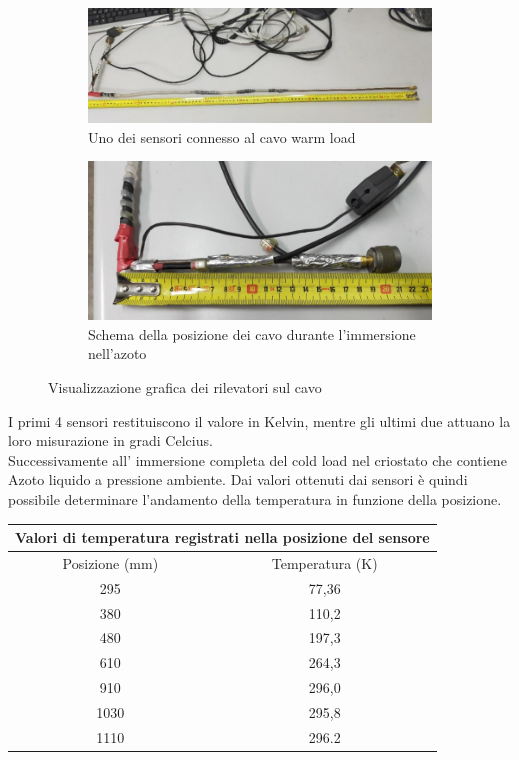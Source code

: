 \begin{figure}[h]
	\begin{subfigure}{0.49\textwidth}
		\includegraphics[width=\textwidth]{Posizione_sensori_2.png}
    		\caption{Uno dei sensori connesso al cavo warm load}
    		\label{fig:sub3}
	\end{subfigure}
	\hfill
	\begin{subfigure}{0.49\textwidth}
    		\includegraphics[width=\textwidth]{Posizione_sensori_4.png}
    		\caption{Schema della posizione dei cavo durante l'immersione nell'azoto}
    		\label{fig:sub4}
	\end{subfigure}

\caption{Visualizzazione grafica dei rilevatori sul cavo}
\label{fig:cavi}
\end{figure}


I primi 4 sensori restituiscono il valore in Kelvin, mentre gli ultimi due attuano la loro misurazione in gradi Celcius.\\
Successivamente all' immersione completa del cold load nel criostato che contiene Azoto liquido a pressione ambiente. Dai valori ottenuti dai sensori è quindi possibile determinare l'andamento della temperatura in funzione della posizione. 

\begin{table}
\centering

\begin{tabular}{ |c|c|  }
	\hline
	\multicolumn{2}{|c|}{Valori di temperatura registrati nella posizione del sensore} \\
	\hline
	Posizione (mm)& Temperatura (K) \\
	\hline
	295   & 77,36    \\
	380  & 110,2  \\
	480 &197,3 \\
	610    &264,3 \\
	910&   296,0  \\
	1030& 295,8  \\
	1110& 296.2  \\
	\hline
\end{tabular}

\end{table}

